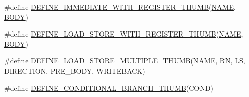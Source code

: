\begin{DoxyCompactItemize}
\item 
\#define \mbox{\hyperlink{isa-thumb_8c_a27d6bec3e41a99b34e244e6dd3ae7505}{D\+E\+F\+I\+N\+E\+\_\+\+I\+M\+M\+E\+D\+I\+A\+T\+E\+\_\+\+W\+I\+T\+H\+\_\+\+R\+E\+G\+I\+S\+T\+E\+R\+\_\+\+T\+H\+U\+MB}}(\mbox{\hyperlink{inflate_8h_a164ea0159d5f0b5f12a646f25f99eceaa67bc2ced260a8e43805d2480a785d312}{N\+A\+ME}},  \mbox{\hyperlink{gzlog_8c_aa6bdf6a6d9916c343e1e17774d84a156}{B\+O\+DY}})
\item 
\#define \mbox{\hyperlink{isa-thumb_8c_a6032a23085784e5aafd1aa033ff8b0d8}{D\+E\+F\+I\+N\+E\+\_\+\+L\+O\+A\+D\+\_\+\+S\+T\+O\+R\+E\+\_\+\+W\+I\+T\+H\+\_\+\+R\+E\+G\+I\+S\+T\+E\+R\+\_\+\+T\+H\+U\+MB}}(\mbox{\hyperlink{inflate_8h_a164ea0159d5f0b5f12a646f25f99eceaa67bc2ced260a8e43805d2480a785d312}{N\+A\+ME}},  \mbox{\hyperlink{gzlog_8c_aa6bdf6a6d9916c343e1e17774d84a156}{B\+O\+DY}})
\item 
\#define \mbox{\hyperlink{isa-thumb_8c_a3adfa9d9d616a26c0d455a043d45d2ba}{D\+E\+F\+I\+N\+E\+\_\+\+L\+O\+A\+D\+\_\+\+S\+T\+O\+R\+E\+\_\+\+M\+U\+L\+T\+I\+P\+L\+E\+\_\+\+T\+H\+U\+MB}}(\mbox{\hyperlink{inflate_8h_a164ea0159d5f0b5f12a646f25f99eceaa67bc2ced260a8e43805d2480a785d312}{N\+A\+ME}},  RN,  LS,  D\+I\+R\+E\+C\+T\+I\+ON,  P\+R\+E\+\_\+\+B\+O\+DY,  W\+R\+I\+T\+E\+B\+A\+CK)
\item 
\#define \mbox{\hyperlink{isa-thumb_8c_ae98e90d8562d44b0a917b60365c03672}{D\+E\+F\+I\+N\+E\+\_\+\+C\+O\+N\+D\+I\+T\+I\+O\+N\+A\+L\+\_\+\+B\+R\+A\+N\+C\+H\+\_\+\+T\+H\+U\+MB}}(C\+O\+ND)
\end{DoxyCompactItemize}
